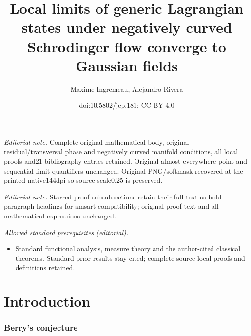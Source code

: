 \documentclass[10pt]{amsart}
\title{Local limits of generic Lagrangian states under negatively curved Schrodinger flow converge to Gaussian fields}
\author{Maxime Ingremeau, Alejandro Rivera}
\date{doi:10.5802/jep.181; CC BY 4.0}
\theoremstyle{plain}
\theoremstyle{definition}
\begin{document}
\maketitle
\noindent\textit{Editorial note.} Complete original mathematical body, original residual/transversal phase and negatively curved manifold conditions, all local proofs and21 bibliography entries retained. Original almost-everywhere point and sequential limit quantifiers unchanged. Original PNG/softmask recovered at the printed native144dpi so source scale0.25 is preserved.\par\medskip
\noindent\textit{Editorial note.} Starred proof subsubsections retain their full text as bold paragraph headings for amsart compatibility; original proof text and all mathematical expressions unchanged.\par\medskip
\noindent\textit{Allowed standard prerequisites (editorial).}\begin{itemize}
\item Standard functional analysis, measure theory and the author-cited classical theorems. Standard prior results stay cited; complete source-local proofs and definitions retained.
\end{itemize}\medskip
\vspace*{-\baselineskip}\enlargethispage{.5\baselineskip}
\tableofcontents


\section{Introduction}

\subsubsection*{Berry's conjecture}
\end{document}
